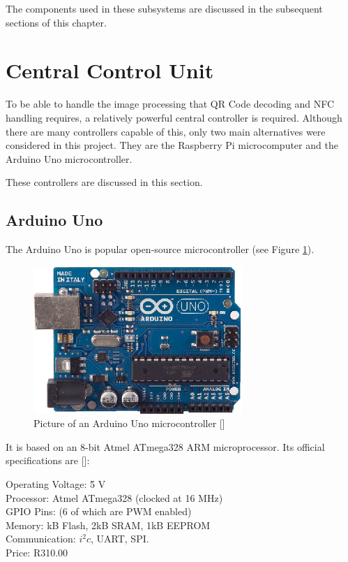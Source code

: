 The components used in these subsystems are discussed in the subsequent sections of this
chapter.

\section{Central Control Unit}

To be able to handle the image processing that QR Code decoding and NFC handling requires, a
relatively powerful central controller is required. Although there are many controllers capable
of this, only two main alternatives were considered in this project. They are the
Raspberry Pi microcomputer and the Arduino Uno microcontroller.

These controllers are discussed in this section.

\subsection{Arduino Uno}

The Arduino Uno is popular open-source microcontroller (see Figure \ref{fig:arduino}). 

\begin{figure}
\centering
\includegraphics[scale=1.5]{arduino.eps}
\caption[Picture of an Arduino Uno microcontroller]{Picture of an Arduino Uno microcontroller
[\cite{manual:arduino-specs}]}
\label{fig:arduino}
\end{figure}

It is based on an 8-bit Atmel ATmega328 ARM microprocessor. Its
official specifications are [\cite{manual:arduino-specs}]:

\begin{tabbing}
  Operating Voltage: \= 5 V \\ 
  Processor: \> Atmel ATmega328 (clocked at 16 MHz) \\
  GPIO Pins:  (6 of which are PWM enabled) \\
  Memory:  kB Flash, 2kB SRAM, 1kB EEPROM \\
  Communication: \> $i^2c$, UART, SPI. \\
  Price: \> R310.00 \\
\end{tabbing}

